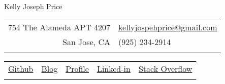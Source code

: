 \documentclass{article}
\begin{document}
\thispagestyle{empty} 

\center \huge{Kelly Joseph Price}
\normalsize

\hspace{.5cm}

{
    \footnotesize
    \centering
    \begin{tabular}{rl}
        754 The Alameda APT 4207\newline
        &
        \href{mailto:kellyjosephprice@gmail.com}{kellyjospehprice@gmail.com}\newline
        \\
        San Jose, CA
        &
        (925) 234-2914
        \\\\
    \end{tabular}
}

\begin{tabularx}{\textwidth}{CCCCC}
    \footnotesize
    \href{https://github.com/kellyjosephprice}{Github}
    &
    \footnotesize
    \href{http://kellyjosephprice.tumblr.com}{Blog}
    &
    \footnotesize
    \href{http://kellyjosephprice.github.io}{Profile}
    &
    \footnotesize
    \href{https://www.linkedin.com/pub/kelly-price/22/760/a11}{Linked-in}
    &
    \footnotesize
    \href{https://careers.stackoverflow.com/kellyjosephprice}{Stack Overflow}
    \\\\
\end{tabularx}
\end{document}
